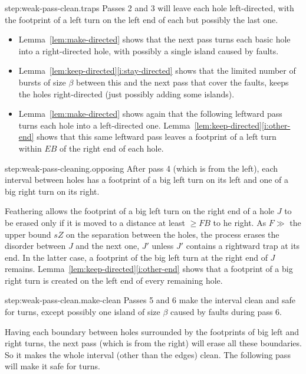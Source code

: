 \documentclass[11pt]{memoir}
\theoremstyle{definition} %
\renewcommand{\ge}{\geq}
\def\B{B}
\newcommand{\E}{E} %
\newcommand{\F}{F}
\newcommand{\s}{s} %
\newcommand{\Z}{Z} %
\begin{document}
\begin{Proof}
  \begin{step+}{step:weak-pass-clean.traps}
    Passes 2 and 3 will leave each hole left-directed, with the footprint of a left turn
    on the left end of each but possibly the last one.
\end{step+}
\begin{pproof}
  \begin{itemize}
  \item Lemma~\ref{lem:make-directed} shows that the
next pass turns each basic hole into a right-directed hole, with possibly a single island
caused by faults.
 \item Lemma~\ref{lem:keep-directed}\eqref{i:stay-directed} shows that
   the limited number of bursts of size \( \beta \) between this and the next pass
   that cover the faults, keeps the holes right-directed (just possibly adding some islands).
\item
  Lemma~\ref{lem:make-directed} shows again that the following leftward pass turns
  each hole into a left-directed one.
  Lemma~\ref{lem:keep-directed}\eqref{i:other-end} shows that this same leftward pass
  leaves a footprint of a left turn within \( \E\B \) of the right end of each hole.
  \end{itemize}
\end{pproof} %

\begin{step+}{step:weak-pass-cleaning.opposing}
  After pass 4 (which is from the left),
  each interval between holes has a footprint of a big left turn on its left and one
  of a big right turn on its right.
\end{step+}
\begin{pproof}
  Feathering allows the footprint of a big left turn
  on the right end of a hole \( J \) to be erased only if it is
  moved to  a distance at least \( \ge\F\B \) to he right.
  As \( \F \gg \) the upper bound \( \s\Z \) on the separation between the holes,
  the process erases the disorder between \( J \) and the next one, \( J' \) unless \( J' \) contains
  a rightward trap at its end.
  In the latter case, a footprint of the big left turn at the right end of \( J \) remains.
  Lemma~\ref{lem:keep-directed}\eqref{i:other-end} shows that a footprint of a 
  big right turn is created on the left end of every remaining hole.
\end{pproof} %

\begin{step+}{step:weak-pass-clean.make-clean}
  Passes 5 and 6 make the interval clean and safe for turns, except possibly one island of size \( \beta \)
  caused by faults during pass 6.
\end{step+}
\begin{pproof}
  Having each boundary between holes surrounded by the footprints of big left and right turns,
  the next pass (which is from the right) will erase all these boundaries.
  So it makes the whole interval (other than the edges) clean.
  The following pass will make it safe for turns.
\end{pproof} %
  

\end{Proof}
\end{document}
